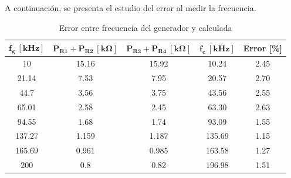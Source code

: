 A continuación, se presenta el estudio del error al medir la frecuencia.

\begin{table}[H]
\centering
\begin{tabular}{ccccc}
\hline
$\mathbf{f_g \ [kHz]}$ & $\mathbf{P_{R1} + P_{R2} \ [k\Omega]}$ & $\mathbf{P_{R3} + P_{R4} \ [k\Omega]}$ & $\mathbf{f_c \ [kHz]}$ & \textbf{Error [\%]} \\
\hline
10                     & 15.16                                  & 15.92                                  & 10.24                  & 2.45                \\
21.14                  & 7.53                                   & 7.95                                   & 20.57                  & 2.70                \\
44.7                   & 3.56                                   & 3.75                                   & 43.56                  & 2.55                \\
65.01                  & 2.58                                   & 2.45                                   & 63.30                  & 2.63                \\
94.55                  & 1.68                                   & 1.74                                   & 93.09                  & 1.55                \\
137.27                 & 1.159                                  & 1.187                                  & 135.69                 & 1.15                \\
165.69                 & 0.961                                  & 0.985                                  & 163.58                 & 1.27                \\
200                    & 0.8                                    & 0.82                                   & 196.98                 & 1.51   				\\
\hline            
\end{tabular}
\caption{Error entre frecuencia del generador y calculada}
\label{tab:Tabla_error}
\end{table}

